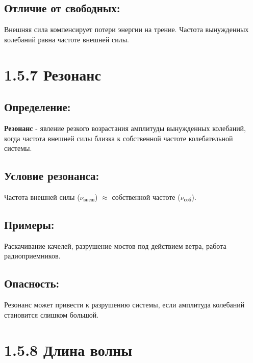 \documentclass[a4paper,12pt]{article}
\begin{document}
\subsection*{Отличие от свободных:}
\vspace{-3pt}
Внешняя сила компенсирует потери энергии на трение. Частота вынужденных колебаний равна частоте внешней силы.

\newpage
\section*{1.5.7 Резонанс}

\vspace{-9pt}
\subsection*{Определение:}
\vspace{-3pt}
\textbf{Резонанс} - явление резкого возрастания амплитуды вынужденных колебаний, когда частота внешней силы близка к собственной частоте колебательной системы.

\vspace{-9pt}
\subsection*{Условие резонанса:}
\vspace{-3pt}
Частота внешней силы ($\nu_{\text{внеш}}$) $\approx$ собственной частоте ($\nu_{\text{соб}}$).

\vspace{-9pt}
\subsection*{Примеры:}
\vspace{-3pt}
Раскачивание качелей, разрушение мостов под действием ветра, работа радиоприемников.

\vspace{-9pt}
\subsection*{Опасность:}
\vspace{-3pt}
Резонанс может привести к разрушению системы, если амплитуда колебаний становится слишком большой.

\section*{1.5.8 Длина волны}
\end{document}
